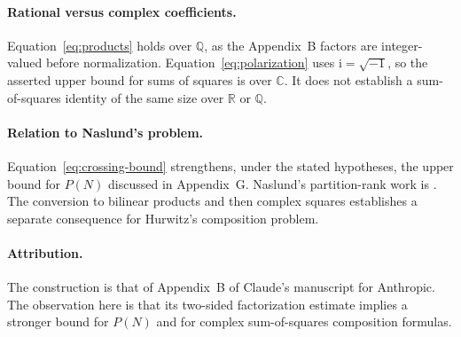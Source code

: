 \documentclass[11pt,a4paper]{article}
\newcommand{\CC}{\mathbb C}
\newcommand{\QQ}{\mathbb Q}
\newcommand{\RR}{\mathbb R}
\newcommand{\ii}{\mathrm i}
\begin{document}
\paragraph{Rational versus complex coefficients.}
Equation~\eqref{eq:products} holds over \(\QQ\), as the Appendix~B factors
are integer-valued before normalization.
Equation~\eqref{eq:polarization} uses \(\ii=\sqrt{-1}\), so the asserted
upper bound for sums of squares is over \(\CC\). It does not establish a
sum-of-squares identity of the same size over \(\RR\) or \(\QQ\).

\paragraph{Relation to Naslund's problem.}
Equation~\eqref{eq:crossing-bound} strengthens, under the stated
hypotheses, the upper bound for \(P(N)\) discussed in Appendix~G.
Naslund's partition-rank work is \cite{naslund2020}. The conversion to
bilinear products and then complex squares establishes a separate
consequence for Hurwitz's composition problem.

\paragraph{Attribution.}
The construction is that of Appendix~B of Claude's manuscript for
Anthropic. The observation here is that its two-sided
factorization estimate implies a stronger bound for \(P(N)\) and for
complex sum-of-squares composition formulas.
\end{document}
